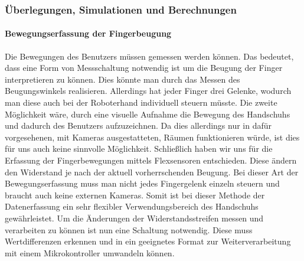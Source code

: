 \documentclass[titlepage,12pt,twoside]{article}
\begin{document}
\subsubsection{Überlegungen, Simulationen und Berechnungen}
\label{chap:Überlegungen, Simulationen und Berechnungen}
\paragraph{Bewegungserfassung der Fingerbeugung}
\hfill \break
\hfill \break
Die Bewegungen des Benutzers müssen gemessen werden können. Das bedeutet, dass eine Form von Messschaltung notwendig ist um die  
Beugung der Finger interpretieren zu können. Dies könnte man durch das Messen des Beugungswinkels realisieren. Allerdings hat 
jeder Finger drei Gelenke, wodurch man diese auch bei der Roboterhand individuell steuern müsste. Die zweite Möglichkeit wäre, 
durch eine visuelle Aufnahme die Bewegung des Handschuhs und dadurch des Benutzers aufzuzeichnen. Da dies allerdings nur in dafür vorgesehenen, 
mit Kameras ausgestatteten, Räumen funktionieren würde, ist dies für uns auch keine sinnvolle Möglichkeit. Schließlich haben 
wir uns für die Erfassung der Fingerbewegungen mittels Flexsensoren entschieden. Diese ändern den Widerstand je nach der 
aktuell vorherrschenden Beugung. Bei dieser Art der Bewegungserfassung muss man nicht jedes Fingergelenk einzeln steuern und 
braucht auch keine externen Kameras. Somit ist bei dieser Methode der Datenerfassung ein sehr flexibler Verwendungsbereich 
des Handschuhs gewährleistet. Um die Änderungen der Widerstandsstreifen messen und verarbeiten zu können ist nun eine Schaltung 
notwendig. Diese muss Wertdifferenzen erkennen und in ein geeignetes Format zur Weiterverarbeitung mit einem Mikrokontroller
umwandeln können. \\
\newpage
\end{document}
